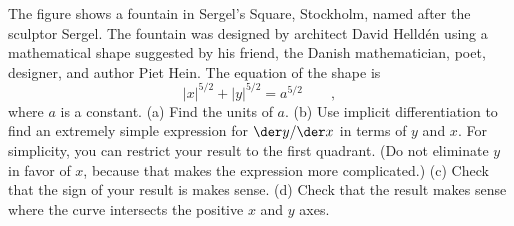 The figure shows a fountain in Sergel's Square, Stockholm, named after
the sculptor Sergel. The fountain was designed by 
architect David Helld\'en using a mathematical shape suggested by his friend,
the Danish mathematician,
poet, designer, and author Piet Hein. The equation of the shape is
\begin{equation*}
  |x|^{5/2}+|y|^{5/2} = a^{5/2} \qquad ,
\end{equation*}
where $a$ is a constant.
(a) Find the units of $a$.
(b) Use implicit differentiation to find
an extremely simple expression for  $\der y/\der x$ in terms of $y$ and $x$.
For simplicity, you can restrict your result to the first quadrant.
(Do not eliminate $y$ in favor of $x$, because that makes the expression more complicated.)
(c) Check that the sign of your result is makes sense.
(d) Check that the result makes sense where the curve intersects the positive
$x$ and $y$ axes.
